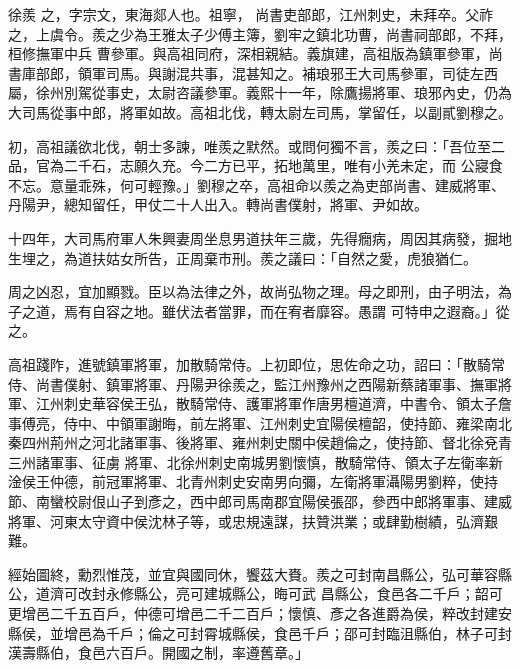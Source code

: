
\begin{pinyinscope}

 徐羨
 之，字宗文，東海郯人也。祖寧，
 尚書吏部郎，江州刺史，未拜卒。父祚之，上虞令。羨之少為王雅太子少傅主簿，劉牢之鎮北功曹，尚書祠部郎，不拜，桓修撫軍中兵
 曹參軍。與高祖同府，深相親結。義旗建，高祖版為鎮軍參軍，尚書庫部郎，領軍司馬。與謝混共事，混甚知之。補琅邪王大司馬參軍，司徒左西屬，徐州別駕從事史，太尉咨議參軍。義熙十一年，除鷹揚將軍、琅邪內史，仍為大司馬從事中郎，將軍如故。高祖北伐，轉太尉左司馬，掌留任，以副貳劉穆之。



 初，高祖議欲北伐，朝士多諫，唯羨之默然。或問何獨不言，羨之曰：「吾位至二品，官為二千石，志願久充。今二方已平，拓地萬里，唯有小羌未定，而
 公寢食不忘。意量乖殊，何可輕豫。」劉穆之卒，高祖命以羨之為吏部尚書、建威將軍、丹陽尹，總知留任，甲仗二十人出入。轉尚書僕射，將軍、尹如故。



 十四年，大司馬府軍人朱興妻周坐息男道扶年三歲，先得癇病，周因其病發，掘地生埋之，為道扶姑女所告，正周棄市刑。羨之議曰：「自然之愛，虎狼猶仁。



 周之凶忍，宜加顯戮。臣以為法律之外，故尚弘物之理。母之即刑，由子明法，為子之道，焉有自容之地。雖伏法者當罪，而在宥者靡容。愚謂
 可特申之遐裔。」從之。



 高祖踐阼，進號鎮軍將軍，加散騎常侍。上初即位，思佐命之功，詔曰：「散騎常侍、尚書僕射、鎮軍將軍、丹陽尹徐羨之，監江州豫州之西陽新蔡諸軍事、撫軍將軍、江州刺史華容侯王弘，散騎常侍、護軍將軍作唐男檀道濟，中書令、領太子詹事傅亮，侍中、中領軍謝晦，前左將軍、江州刺史宜陽侯檀韶，使持節、雍梁南北秦四州荊州之河北諸軍事、後將軍、雍州刺史關中侯趙倫之，使持節、督北徐兗青三州諸軍事、征虜
 將軍、北徐州刺史南城男劉懷慎，散騎常侍、領太子左衛率新淦侯王仲德，前冠軍將軍、北青州刺史安南男向彌，左衛將軍灄陽男劉粹，使持節、南蠻校尉佷山子到彥之，西中郎司馬南郡宜陽侯張邵，參西中郎將軍事、建威將軍、河東太守資中侯沈林子等，或忠規遠謀，扶贊洪業；或肆勤樹績，弘濟艱難。



 經始圖終，勳烈惟茂，並宜與國同休，饗茲大賚。羨之可封南昌縣公，弘可華容縣公，道濟可改封永修縣公，亮可建城縣公，晦可武
 昌縣公，食邑各二千戶；韶可更增邑二千五百戶，仲德可增邑二千二百戶；懷慎、彥之各進爵為侯，粹改封建安縣侯，並增邑為千戶；倫之可封霄城縣侯，食邑千戶；邵可封臨沮縣伯，林子可封漢壽縣伯，食邑六百戶。開國之制，率遵舊章。」




\end{pinyinscope}
